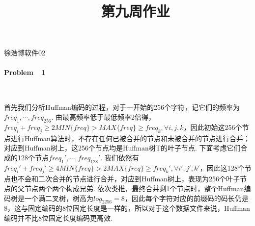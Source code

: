 \documentclass[UTF8]{ctexart}
\begin{document}
\renewcommand{\thefootnote}{\fnsymbol{footnote}}
\linespread{1.4}
\title{\vspace{-5em}\ \ 第九周作业\vspace{-2.5em}}
\date{}
\maketitle
\begin{center}
{\fangsong 徐浩博\quad 软件02}
\end{center}

\paragraph*{Problem\ \ 1}\ \par
首先我们分析Huffman编码的过程，对于一开始的256个字符，记它们的频率为$freq_1,\cdots,freq_{256}$. 由最高频率低于最低频率2倍得，$freq_i+freq_j\geq 2MIN\{freq\}>MAX\{freq\}\geq freq_k, \forall i,j,k$，因此初始这256个节点进行Huffman算法时，不存在任何已被合并的节点和未被合并的节点进行合并；对应到Huffman树上，这256个节点均是Huffman树T的叶子节点. 下面考虑它们合成的128个节点$freq_1',\cdots,freq_{128}'$. 我们依然有$freq_i'+freq_j'\geq 4MIN\{freq\}>2MAX\{freq\}\geq freq_k', \forall i',j',k'$，因此这128个节点也不会和二次合并的节点进行合并，对应到Huffman树上，表现为256个叶子节点的父节点两个两个构成兄弟. 依次类推，最终合并剩1个节点时，整个Huffman编码树是一个满二叉树，树高为$log_2256=8$，因此每个字符对应的前缀码的码长仍是8，这与固定编码的8位固定长度是一样的，所以对于这个数据文件来说，Huffman编码并不比8位固定长度编码更高效.
\end{document}
